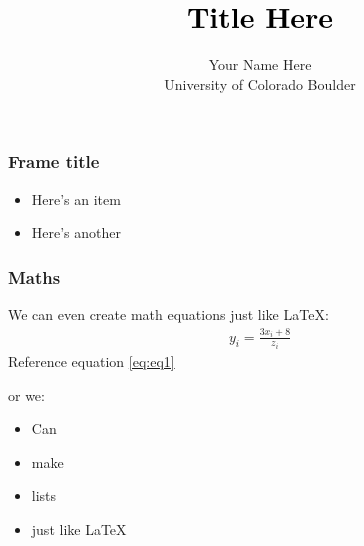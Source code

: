 \documentclass[mathserif,ignorenonframetext]{beamer}
\title[CU Boulder]{\textcolor{black}{Title Here}}
\author[\copyright\ Last Name 2017]{
Your Name Here\\ \bigskip 
{\small University of Colorado Boulder} }
\date{}
\begin{document}
\frame{\titlepage}




\begin{frame}\frametitle{Frame title}

\begin{itemize}\setlength\itemsep{1em}
\item Here's an item\pause
\item Here's another
\end{itemize}	
\end{frame}


\begin{frame}\frametitle{Maths}
	We can even create math equations just like \LaTeX:
	\begin{align}\label{eq:eq1}
	y_{i}=\frac{3x_{i}+8}{z_{i}}
	\end{align}
	{\color{cyan} Reference equation} \ref{eq:eq1}
	\pause
	
	or we:
	\begin{itemize}
		\item Can
		\item make
		\item lists
		\item just like \LaTeX
	\end{itemize}  
\end{frame}


\end{document}
